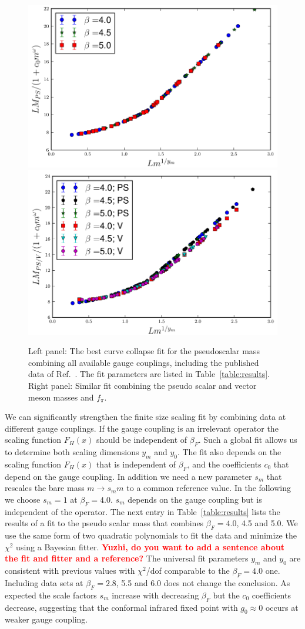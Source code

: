 \documentclass[aps,prl,twocolumn,]{revtex4}  %
\newcommand{\TODO}[1]{\textcolor{red}{{\bf #1}}}
\begin{document}

\begin{figure}[tbp]
\centering
  \includegraphics[width=0.45\linewidth]{pion_combined}\hfill
  \includegraphics[width=0.45\linewidth]{rho_combined}
  \caption{\label{fig:fss_combined} Left panel: The best curve collapse fit for the pseudoscalar mass combining  all available gauge couplings, including the published data of Ref.~\protect\cite{Fodor:2011tu,Aoki:2012eq}. The fit parameters are listed in Table~\protect\ref{table:results}. Right panel: Similar fit combining the pseudo scalar and  vector meson masses and $f_\pi$.  }
\end{figure}

We can significantly strengthen  the finite size scaling fit   by combining data at different gauge couplings. If the gauge coupling is an irrelevant operator the scaling function $F_H(x)$ should be independent of $\beta_F$. Such a global fit allows us to determine both  scaling dimensions  $y_m$ and $y_0$. The fit also depends on the  scaling function $F_H(x)$ that is  independent of $\beta_F$, and the coefficients $c_0$ that depend on the gauge coupling. In addition we need a new parameter $s_m$ that rescales the bare mass $m \to s_m m$ to a common reference value. In the following we choose $s_m=1$ at $\beta_F=4.0$. $s_m$ depends on the gauge coupling but is independent of the operator. The next entry in Table~\ref{table:results} lists the results of a fit to the pseudo scalar mass that combines $\beta_F=4.0$, 4.5 and 5.0. We use the same  form of two quadratic polynomials to fit the data and minimize the $\chi^2$ using a Bayesian fitter. \TODO{Yuzhi, do you want to add a sentence about the fit and fitter and a reference?}  The universal fit parameters $y_m$ and $y_0$ are consistent with previous values with $\chi^2$/dof  comparable to the   $\beta_F=4.0$ one. Including  data sets at $\beta_F=2.8$, 5.5 and 6.0 does not change the conclusion. As expected the  scale factors $s_m$ increase with decreasing $\beta_F$ but the $c_0$ coefficients decrease, suggesting that the conformal infrared fixed point with $g_0\approx 0$ occurs at weaker gauge coupling. 
\end{document}
